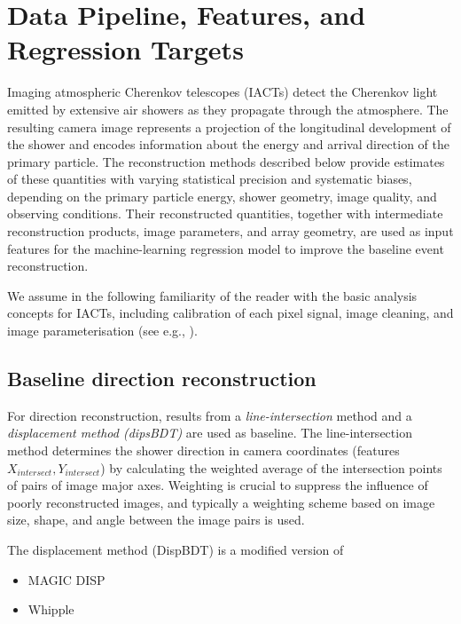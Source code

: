 \documentclass[12pt]{article}
\begin{document}
\section{Data Pipeline, Features, and Regression Targets}
\label{sec:features_and_targets}

Imaging atmospheric Cherenkov telescopes (IACTs) detect the Cherenkov light emitted
by extensive air showers as they propagate through the atmosphere.
The resulting camera image represents a projection of the longitudinal
development of the shower and encodes information about the energy and arrival direction of
the primary particle.
The reconstruction methods described below provide estimates of these quantities
with varying statistical precision and systematic biases, depending on the primary
particle energy, shower geometry, image quality, and observing conditions.
Their reconstructed quantities, together with intermediate reconstruction products,
image parameters, and array geometry, are used as input features for the
machine-learning regression model to improve the baseline event reconstruction.

We assume in the following familiarity of the reader with the basic analysis concepts for IACTs,
including calibration of each pixel signal, image cleaning, and image parameterisation
(see e.g., \cite{1997APh.....6..343A, 2006APh....25..391H}).


\subsection{Baseline direction reconstruction}

For direction reconstruction, results from a \textit{line-intersection} method and a
\textit{displacement method (dipsBDT)} are used as baseline.
The line-intersection method \citep{1991ApJ...377L..97A} determines
the shower direction in camera coordinates (features $X_{intersect}, Y_{intersect}$)
by calculating the weighted average of the intersection points of pairs of
image major axes.
Weighting is crucial to suppress the influence of poorly reconstructed images,
and typically a weighting scheme based on image size, shape, and angle between
the image pairs is used.

The displacement method (DispBDT) is a modified version of

\begin{itemize}
  \item MAGIC DISP \citep{2016APh....72...76A}
  \item Whipple \citep{1998APh.....8..179C}
\end{itemize}
\end{document}
